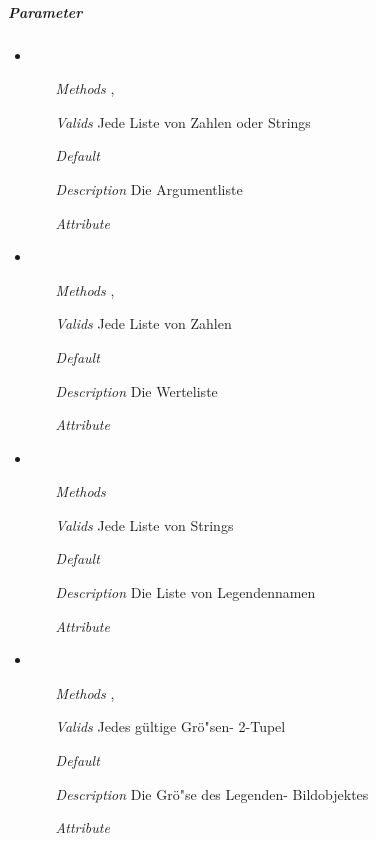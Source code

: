 
\subparagraph{Parameter}
\begin{itemize}
  
\item {}
\begin{enumerate}
\item[\textit{Methods}] ,
\item[\textit{Valids}] Jede Liste von Zahlen oder Strings
\item[\textit{Default}] \wancicode{[0]}
\item[\textit{Description}] Die Argumentliste
\item[\textit{Attribute}] 
\end{enumerate}

\item {}
\begin{enumerate}
\item[\textit{Methods}] ,
\item[\textit{Valids}] Jede Liste von Zahlen
\item[\textit{Default}] \wancicode{[0]}
\item[\textit{Description}] Die Werteliste
\item[\textit{Attribute}] 
\end{enumerate}

\item {}
\begin{enumerate}
\item[\textit{Methods}] 
\item[\textit{Valids}] Jede Liste von Strings
\item[\textit{Default}] \wancicode{[]}
\item[\textit{Description}] Die Liste von Legendennamen
\item[\textit{Attribute}] 
\end{enumerate}

\item {}
\begin{enumerate}
\item[\textit{Methods}] ,
\item[\textit{Valids}] Jedes g\"ultige Gr\"o"sen- 2-Tupel
\item[\textit{Default}] 
\item[\textit{Description}] Die Gr\"o"se des Legenden- Bildobjektes
\item[\textit{Attribute}] 
\end{enumerate}


\end{itemize}
